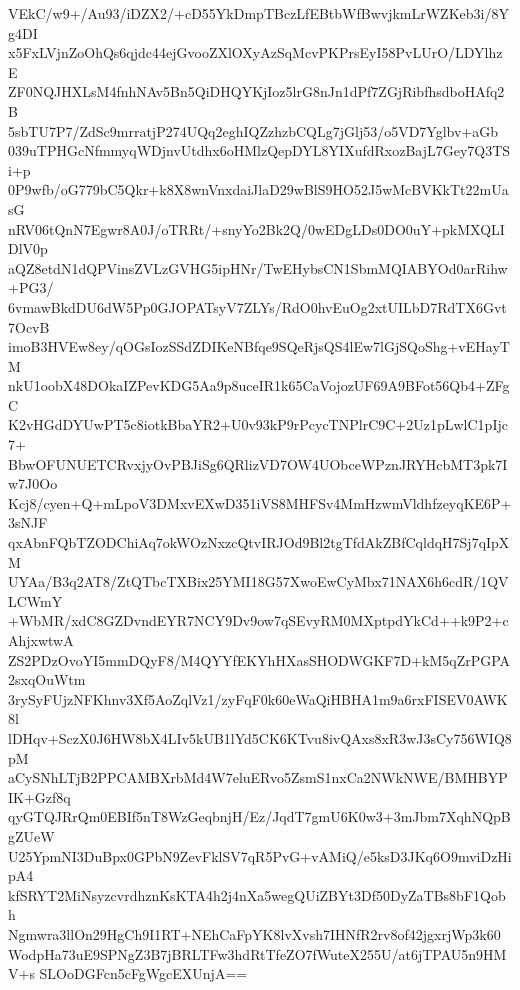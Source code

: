 VEkC/w9+/Au93/iDZX2/+cD55YkDmpTBczLfEBtbWfBwvjkmLrWZKeb3i/8Yg4DI
x5FxLVjnZoOhQs6qjdc44ejGvooZXlOXyAzSqMcvPKPrsEyI58PvLUrO/LDYlhzE
ZF0NQJHXLsM4fnhNAv5Bn5QiDHQYKjIoz5lrG8nJn1dPf7ZGjRibfhsdboHAfq2B
5sbTU7P7/ZdSc9mrratjP274UQq2eghIQZzhzbCQLg7jGlj53/o5VD7Yglbv+aGb
039uTPHGcNfmmyqWDjnvUtdhx6oHMlzQepDYL8YIXufdRxozBajL7Gey7Q3TSi+p
0P9wfb/oG779bC5Qkr+k8X8wnVnxdaiJlaD29wBlS9HO52J5wMcBVKkTt22mUasG
nRV06tQnN7Egwr8A0J/oTRRt/+snyYo2Bk2Q/0wEDgLDs0DO0uY+pkMXQLIDlV0p
aQZ8etdN1dQPVinsZVLzGVHG5ipHNr/TwEHybsCN1SbmMQIABYOd0arRihw+PG3/
6vmawBkdDU6dW5Pp0GJOPATsyV7ZLYs/RdO0hvEuOg2xtUILbD7RdTX6Gvt7OcvB
imoB3HVEw8ey/qOGsIozSSdZDIKeNBfqe9SQeRjsQS4lEw7lGjSQoShg+vEHayTM
nkU1oobX48DOkaIZPevKDG5Aa9p8uceIR1k65CaVojozUF69A9BFot56Qb4+ZFgC
K2vHGdDYUwPT5c8iotkBbaYR2+U0v93kP9rPcycTNPlrC9C+2Uz1pLwlC1pIjc7+
BbwOFUNUETCRvxjyOvPBJiSg6QRlizVD7OW4UObceWPznJRYHcbMT3pk7Iw7J0Oo
Kcj8/cyen+Q+mLpoV3DMxvEXwD351iVS8MHFSv4MmHzwmVldhfzeyqKE6P+3sNJF
qxAbnFQbTZODChiAq7okWOzNxzcQtvIRJOd9Bl2tgTfdAkZBfCqldqH7Sj7qIpXM
UYAa/B3q2AT8/ZtQTbcTXBix25YMI18G57XwoEwCyMbx71NAX6h6cdR/1QVLCWmY
+WbMR/xdC8GZDvndEYR7NCY9Dv9ow7qSEvyRM0MXptpdYkCd++k9P2+cAhjxwtwA
ZS2PDzOvoYI5mmDQyF8/M4QYYfEKYhHXasSHODWGKF7D+kM5qZrPGPA2sxqOuWtm
3rySyFUjzNFKhnv3Xf5AoZqlVz1/zyFqF0k60eWaQiHBHA1m9a6rxFISEV0AWK8l
lDHqv+SczX0J6HW8bX4LIv5kUB1lYd5CK6KTvu8ivQAxs8xR3wJ3sCy756WIQ8pM
aCySNhLTjB2PPCAMBXrbMd4W7eluERvo5ZsmS1nxCa2NWkNWE/BMHBYPIK+Gzf8q
qyGTQJRrQm0EBIf5nT8WzGeqbnjH/Ez/JqdT7gmU6K0w3+3mJbm7XqhNQpBgZUeW
U25YpmNI3DuBpx0GPbN9ZevFklSV7qR5PvG+vAMiQ/e5ksD3JKq6O9mviDzHipA4
kfSRYT2MiNsyzcvrdhznKsKTA4h2j4nXa5wegQUiZBYt3Df50DyZaTBs8bF1Qobh
Ngmwra3llOn29HgCh9I1RT+NEhCaFpYK8lvXvsh7IHNfR2rv8of42jgxrjWp3k60
WodpHa73uE9SPNgZ3B7jBRLTFw3hdRtTfeZO7fWuteX255U/at6jTPAU5n9HMV+s
SLOoDGFcn5cFgWgcEXUnjA==
